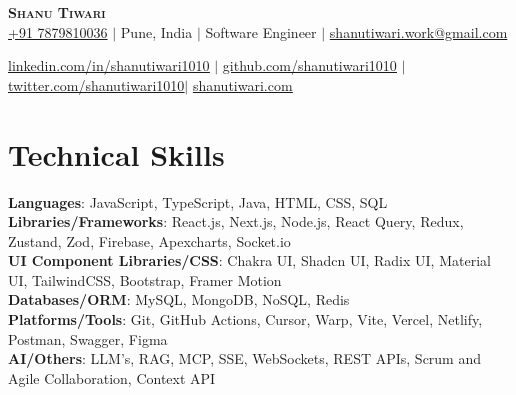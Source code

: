 \documentclass[letterpaper,10pt]{article}
\begin{document}

\begin{center}
  \textbf{\Huge \scshape Shanu Tiwari} \\ \vspace{1pt}
  \href{tel:7879810036}{+91 7879810036} $|$
  {Pune, India} $|$
  {Software Engineer} $|$
  \href{mailto:shanutiwari.work@gmail.com}{shanutiwari.work@gmail.com} \\ \vspace{1pt}

  \href{https://linkedin.com/in/shanutiwari1010}{\underline{linkedin.com/in/shanutiwari1010}} $|$
  \href{https://github.com/shanutiwari1010}{\underline{github.com/shanutiwari1010}} $|$
  \href{https://twitter.com/shanutiwari1010}{\underline{twitter.com/shanutiwari1010}}$|$
   \href{https://shanutiwari.com/}{\underline{shanutiwari.com}} 
  
\end{center}



\section{Technical Skills}
\begin{itemize}[leftmargin=0.15in, label={}]
  \small{\item{
        \textbf{Languages}{: \hfill JavaScript, TypeScript, Java, HTML, CSS, SQL \hfill} \\
        \vspace{3pt}\textbf{Libraries/Frameworks}{: \hfill React.js, Next.js, Node.js, React Query, Redux, Zustand, Zod, Firebase, Apexcharts, Socket.io \hfill} \\
        \vspace{3pt}\textbf{UI Component Libraries/CSS}{: \hfill Chakra UI, Shadcn UI, Radix UI, Material UI, TailwindCSS, Bootstrap, Framer Motion \hfill} \\
        \vspace{3pt}\textbf{Databases/ORM}{: \hfill MySQL, MongoDB, NoSQL, Redis \hfill} \\
        \vspace{3pt}\textbf{Platforms/Tools}{: \hfill Git,  GitHub Actions, Cursor, Warp, Vite, Vercel, Netlify, Postman, Swagger, Figma \hfill} \\
        \vspace{3pt}\textbf{AI/Others}{: \hfill LLM's, RAG, MCP, SSE, WebSockets, REST APIs, Scrum and Agile Collaboration, Context API \hfill} \\
        }}
\end{itemize}
\end{document}
